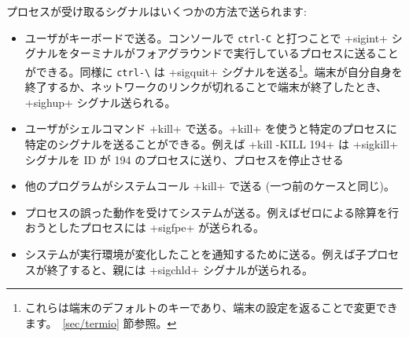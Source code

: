 プロセスが受け取るシグナルはいくつかの方法で送られます:
%
\begin{itemize}

\item ユーザがキーボードで送る。コンソールで \verb'ctrl-C' と打つことで \ml+sigint+ シグナルをターミナルがフォアグラウンドで実行しているプロセスに送ることができる。同様に \verb'ctrl-\' は \ml+sigquit+ シグナルを送る\footnote{これらは端末のデフォルトのキーであり、端末の設定を返ることで変更できます。~\ref {sec/termio} 節参照。}。端末が自分自身を終了するか、ネットワークのリンクが切れることで端末が終了したとき、 \ml+sighup+ シグナル送られる。

\item ユーザがシェルコマンド \ml+kill+ で送る。\ml+kill+ を使うと特定のプロセスに特定のシグナルを送ることができる。例えば \ml+kill -KILL 194+ は \ml+sigkill+ シグナルを ID が 194 のプロセスに送り、プロセスを停止させる

\item 他のプログラムがシステムコール \ml+kill+ で送る (一つ前のケースと同じ)。

\item プロセスの誤った動作を受けてシステムが送る。例えばゼロによる除算を行おうとしたプロセスには \ml+sigfpe+ が送られる。

\item システムが実行環境が変化したことを通知するために送る。例えば子プロセスが終了すると、親には \ml+sigchld+ シグナルが送られる。

\end{itemize}



